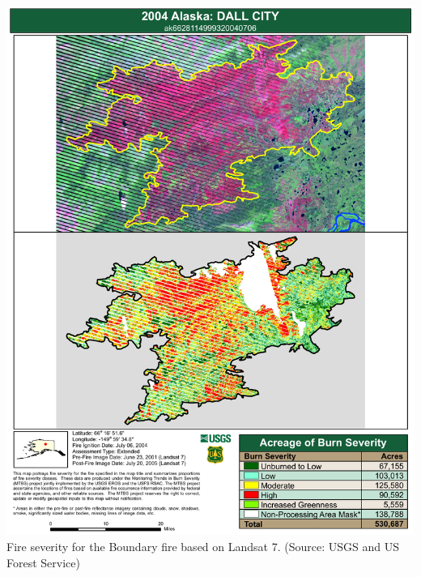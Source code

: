 \documentclass{beamer}
\begin{document}
\begin{frame}
\begin{columns}[T]
\begin{column}{.5\textwidth}
\includegraphics[width=1.0\textwidth]{figs/ak6628114999320040706_map}
\\ 
\tiny 
Fire severity for the Boundary fire based on Landsat 7. (Source: USGS and US Forest Service)

    \end{column}
  \end{columns}
\end{frame}
\end{document}
